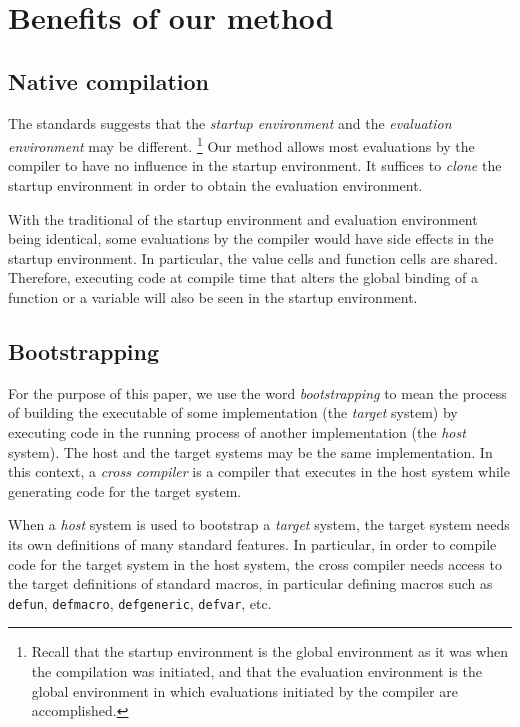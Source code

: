 \section{Benefits of our method}
 
\subsection{Native compilation}

The \commonlisp{} standards suggests that the \emph{startup
  environment} and the \emph{evaluation environment} may be
different.%
\footnote{Recall that the startup environment is the global
environment as it was when the compilation was initiated, and that the
evaluation environment is the global environment in which evaluations
initiated by the compiler are accomplished.}
Our method allows most evaluations by the compiler to have no
influence in the startup environment.  It suffices to \emph{clone} the
startup environment in order to obtain the evaluation environment.

With the traditional of the startup environment and evaluation
environment being identical, some evaluations by the compiler would
have side effects in the startup environment.  In particular, the
value cells and function cells are shared.  Therefore, executing code
at compile time that alters the global binding of a function or a
variable will also be seen in the startup environment.

\subsection{Bootstrapping}

For the purpose of this paper, we use the word \emph{bootstrapping} to
mean the process of building the executable of some implementation
(the \emph{target} system) by executing code in the running process of
another implementation (the \emph{host} system).  The host and the
target systems may be the same implementation.  In this context, a
\emph{cross compiler} is a compiler that executes in the host system
while generating code for the target system.

When a \emph{host} \commonlisp{} system is used to bootstrap a
\emph{target} \commonlisp{} system, the target system needs its own
definitions of many standard \commonlisp{} features.  In particular,
in order to compile code for the target system in the host system, the
cross compiler needs access to the target definitions of standard
\commonlisp{} macros, in particular defining macros such as
\texttt{defun}, \texttt{defmacro}, \texttt{defgeneric},
\texttt{defvar}, etc.

